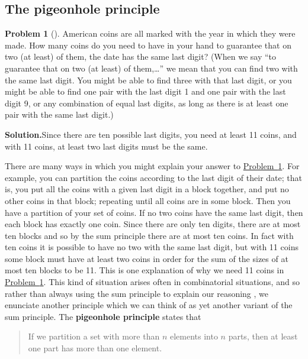 \documentclass[10pt,]{book}
\newcommand{\terminology}[1]{\textbf{#1}}
\theoremstyle{plain}
\theoremstyle{definition}
\newtheorem{activity}[project]{Problem}
\theoremstyle{definition}
\numberwithin{equation}{chapter}
\begin{document}
\subsection[{The pigeonhole principle}]{The pigeonhole principle}\label{subsection-3}
\begin{activity}[]\label{elevencoins}
American coins are all marked with the year in which they were made. How many coins do you need to have in your hand to guarantee that on two (at least) of them, the date has the same last digit? (When we say ``to guarantee that on two (at least) of them,\dots{}'' we mean that you can find two with the same last digit. You might be able to find three with that last digit, or you might be able to find one pair with the last digit 1 and one pair with the last digit 9, or any combination of equal last digits, as long as there is at least one pair with the same last digit.)%
\par\medskip\noindent%
\textbf{Solution.}\quad Since there are ten possible last digits, you need at least 11 coins, and with 11 coins, at least two last digits must be the same.%
\end{activity}
There are many ways in which you might explain your answer to \hyperref[elevencoins]{Problem~\ref{elevencoins}}. For example, you can partition the coins according to the last digit of their date; that is, you put all the coins with a given last digit in a block together, and put no other coins in that block; repeating until all coins are in some block. Then you have a partition of your set of coins. If no two coins have the same last digit, then each block has exactly one coin. Since there are only ten digits, there are at most ten blocks and so by the sum principle there are at most ten coins. In fact with ten coins it is possible to have no two with the same last digit, but with 11 coins some block must have at least two coins in order for the sum of the sizes of at most ten blocks to be 11. This is one explanation of why we need 11 coins in \hyperref[elevencoins]{Problem~\ref{elevencoins}}. This kind of situation arises often in combinatorial situations, and so rather than always using the sum principle to explain our reasoning , we enunciate another principle which we can think of as yet another variant of the sum principle. The \terminology{pigeonhole principle} states that%
\begin{quote}\hypertarget{blockquote-5}{}
If we partition a set with more than \(n\) elements into \(n\) parts, then at least one part has more than one element.%
\end{quote}
\end{document}
